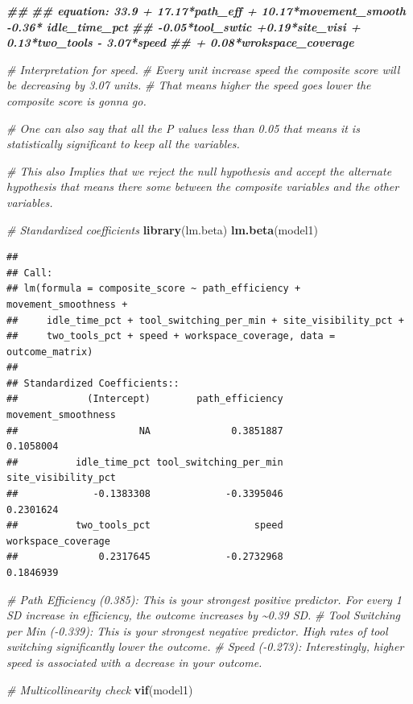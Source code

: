 \documentclass[
]{article}
\newenvironment{Shaded}{\begin{snugshade}}{\end{snugshade}}
\newcommand{\CommentTok}[1]{\textcolor[rgb]{0.56,0.35,0.01}{\textit{#1}}}
\newcommand{\DocumentationTok}[1]{\textcolor[rgb]{0.56,0.35,0.01}{\textbf{\textit{#1}}}}
\newcommand{\FunctionTok}[1]{\textcolor[rgb]{0.13,0.29,0.53}{\textbf{#1}}}
\newcommand{\NormalTok}[1]{#1}
\begin{document}
\begin{Shaded}
\begin{Highlighting}[]
\DocumentationTok{\#\# }
\DocumentationTok{\#\# equation: 33.9 + 17.17*path\_eff + 10.17*movement\_smooth {-}0.36* idle\_time\_pct}
\DocumentationTok{\#\#              {-}0.05*tool\_swtic +0.19*site\_visi + 0.13*two\_tools {-} 3.07*speed}
\DocumentationTok{\#\#              + 0.08*wrokspace\_coverage}

\CommentTok{\# Interpretation for speed. }
\CommentTok{\# Every unit increase speed the composite score will be decreasing by 3.07 units.}
\CommentTok{\# That means higher the speed goes lower the composite score is gonna go.}

\CommentTok{\# One can also say that all the P values less than 0.05 that means it is statistically significant to keep all the variables. }

\CommentTok{\# This also Implies that we reject the null hypothesis and accept the alternate hypothesis that means there some between the composite variables and the other variables.}


\CommentTok{\# Standardized coefficients}
\FunctionTok{library}\NormalTok{(lm.beta)}
\FunctionTok{lm.beta}\NormalTok{(model1)}
\end{Highlighting}
\end{Shaded}

\begin{verbatim}
## 
## Call:
## lm(formula = composite_score ~ path_efficiency + movement_smoothness + 
##     idle_time_pct + tool_switching_per_min + site_visibility_pct + 
##     two_tools_pct + speed + workspace_coverage, data = outcome_matrix)
## 
## Standardized Coefficients::
##            (Intercept)        path_efficiency    movement_smoothness 
##                     NA              0.3851887              0.1058004 
##          idle_time_pct tool_switching_per_min    site_visibility_pct 
##             -0.1383308             -0.3395046              0.2301624 
##          two_tools_pct                  speed     workspace_coverage 
##              0.2317645             -0.2732968              0.1846939
\end{verbatim}

\begin{Shaded}
\begin{Highlighting}[]
\CommentTok{\# Path Efficiency (0.385): This is your strongest positive predictor. For every 1 SD increase in efficiency, the outcome increases by \textasciitilde{}0.39 SD.}
\CommentTok{\# Tool Switching per Min ({-}0.339): This is your strongest negative predictor. High rates of tool switching significantly lower the outcome.}
\CommentTok{\# Speed ({-}0.273): Interestingly, higher speed is associated with a decrease in your outcome.}

\CommentTok{\# Multicollinearity check}
\FunctionTok{vif}\NormalTok{(model1)}
\end{Highlighting}
\end{Shaded}
\end{document}
